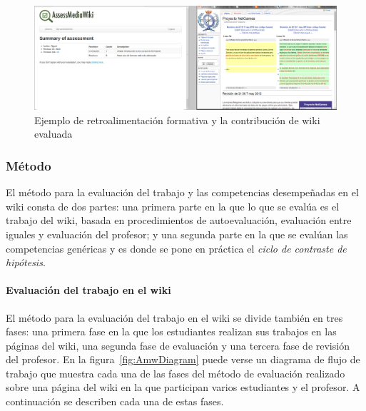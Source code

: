 \begin{figure}
  \begin{center}
    \includegraphics[scale=0.19]{AmwFormative.png}
  \end{center}
  \caption{Ejemplo de retroalimentación formativa y la contribución de wiki evaluada}
  \label{fig:AmwFormative}
\end{figure}

\subsubsection{Método}

El método para la evaluación del trabajo y las competencias desempeñadas en el wiki consta de dos partes: una primera parte en la que lo que se evalúa es el trabajo del wiki, basada en procedimientos de autoevaluación, evaluación entre iguales y evaluación del profesor; y una segunda parte en la que se evalúan las competencias genéricas y es donde se pone en práctica el \emph{ciclo de contraste de hipótesis}.

\paragraph{Evaluación del trabajo en el wiki}

El método para la evaluación del trabajo en el wiki se divide también en tres fases: una primera fase en la que los estudiantes realizan sus trabajos en las páginas del wiki, una segunda fase de evaluación y una tercera fase de revisión del profesor. En la figura~\ref{fig:AmwDiagram} puede verse un diagrama de flujo de trabajo que muestra cada una de las fases del método de evaluación realizado sobre una página del wiki en la que participan varios estudiantes y el profesor. A continuación se describen cada una de estas fases.

